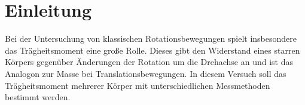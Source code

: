 \section{Einleitung}
Bei der Untersuchung von klassischen Rotationsbewegungen spielt insbesondere das Trägheitsmoment eine große Rolle. Dieses gibt den Widerstand eines starren Körpers gegenüber Änderungen der Rotation um die Drehachse an und ist das Analogon zur Masse bei Translationsbewegungen. In diesem Versuch soll das Trägheitsmoment mehrerer Körper mit unterschiedlichen Messmethoden bestimmt werden.